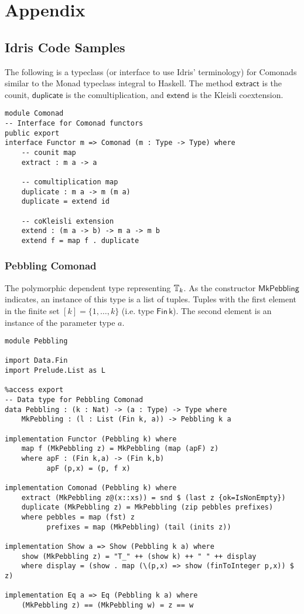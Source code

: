 \chapter{Appendix}
\appendix 
\section{Idris Code Samples}
The following is a typeclass (or interface to use Idris' terminology) for Comonads similar to the Monad typeclass integral to Haskell. The method $\mathsf{extract}$ is the counit, $\mathsf{duplicate}$ is the comultiplication, and $\mathsf{extend}$ is the Kleisli coextension. 
\begin{verbatim}
module Comonad
-- Interface for Comonad functors 
public export
interface Functor m => Comonad (m : Type -> Type) where
    -- counit map
    extract : m a -> a

    -- comultiplication map
    duplicate : m a -> m (m a)
    duplicate = extend id

    -- coKleisli extension
    extend : (m a -> b) -> m a -> m b
    extend f = map f . duplicate
\end{verbatim}
\subsection{Pebbling Comonad}
The polymorphic dependent type representing ${\mathbb{T}_{k}}$. As the constructor $\mathsf{MkPebbling}$ indicates, an instance of this type is a list of tuples. Tuples with the first element in the finite set $[k] = \{1,\dots,k\}$ (i.e. type $\mathsf{Fin} \, \mathsf{k}$). The second element is an instance of the parameter type $a$. 
\begin{verbatim}
module Pebbling

import Data.Fin
import Prelude.List as L

%access export
-- Data type for Pebbling Comonad
data Pebbling : (k : Nat) -> (a : Type) -> Type where
    MkPebbling : (l : List (Fin k, a)) -> Pebbling k a
    
implementation Functor (Pebbling k) where
    map f (MkPebbling z) = MkPebbling (map (apF) z)     
    where apF : (Fin k,a) -> (Fin k,b)
          apF (p,x) = (p, f x)

implementation Comonad (Pebbling k) where
    extract (MkPebbling z@(x::xs)) = snd $ (last z {ok=IsNonEmpty})
    duplicate (MkPebbling z) = MkPebbling (zip pebbles prefixes) 
    where pebbles = map (fst) z 
          prefixes = map (MkPebbling) (tail (inits z)) 

implementation Show a => Show (Pebbling k a) where
    show (MkPebbling z) = "T_" ++ (show k) ++ " " ++ display 
    where display = (show . map (\(p,x) => show (finToInteger p,x)) $ z)

implementation Eq a => Eq (Pebbling k a) where
    (MkPebbling z) == (MkPebbling w) = z == w
\end{verbatim}

